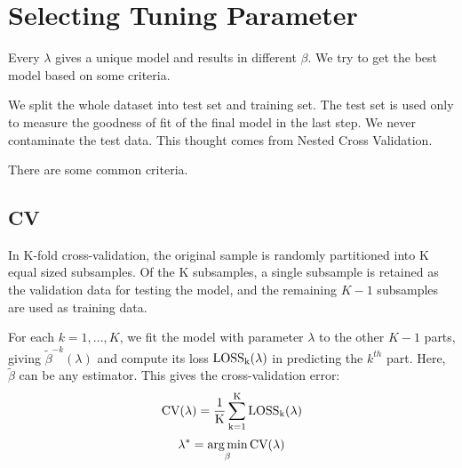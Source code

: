 \documentclass[]{article}
\begin{document}
\section{Selecting Tuning Parameter}
Every $\lambda$ gives a unique model and results in different $\beta$. We try to get the best model based on some criteria.

We split the whole dataset into test set and training set. The test set is used only to measure the goodness of fit of the final model in the last step. We never contaminate the test data. This thought comes from Nested Cross Validation\cite{browne2000cross}.

There are some common criteria.
\subsection{CV}
In K-fold cross-validation, the original sample is randomly partitioned into K equal sized subsamples. Of the K subsamples, a single subsample is retained as the validation data for testing the model, and the remaining $ K-1 $ subsamples are used as training data. 

For each $ k=1,...,K $, we fit the model with parameter $ \lambda $ to the
other $ K-1 $ parts, giving $ \tilde{\beta}^{-k}(\lambda) $ and compute its loss $ \rm LOSS_k(\lambda) $ in predicting the $ k^{th} $ part. Here, $\tilde{\beta}$ can be any estimator. This gives the cross-validation error:
\begin{equation}
\rm CV(\lambda)=\frac{1}{K}\sum_{k=1}^K \rm LOSS_k(\lambda)
\end{equation}
\begin{equation}
\lambda^*=\mathop{\arg\min}_{\beta} \rm CV(\lambda)
\end{equation}
\end{document}
